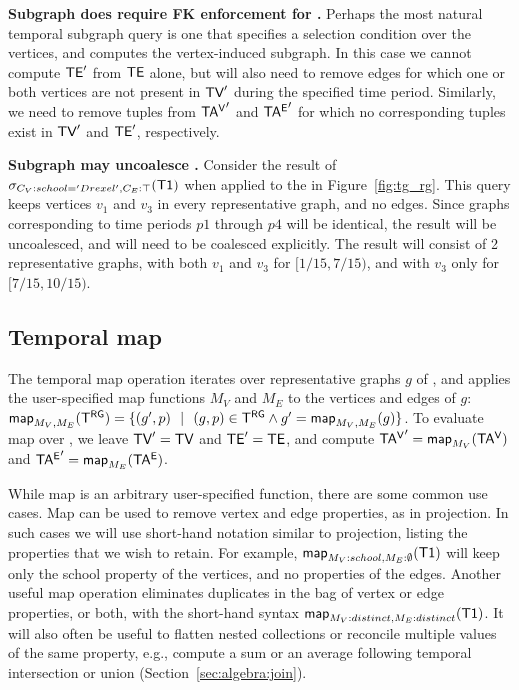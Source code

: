 {\bf Subgraph does require FK enforcement for \tve.}  Perhaps the most
natural temporal subgraph query is one that specifies a selection
condition over the vertices, and computes the vertex-induced subgraph.
In this case we cannot compute $\textsf{TE}'$ from $\textsf{TE}$ alone, but will also
need to remove edges for which one or both vertices are not present in
$\textsf{TV}'$ during the specified time period.  Similarly, we need to remove
tuples from $\mathsf{TA^{V}}'$ and $\mathsf{TA^{E}}'$ for which no corresponding tuples
exist in $\textsf{TV}'$ and $\textsf{TE}'$, respectively.

{\bf Subgraph may uncoalesce \trg.} Consider the result of
$\sigma_{C_V:{school='Drexel'},C_E:\top} (\textsf{T1})$ when applied to
the \tg in Figure~\ref{fig:tg_rg}.  This query keeps vertices $v_1$
and $v_3$ in every representative graph, and no edges.  Since graphs
corresponding to time periods $p1$ through $p4$ will be identical, the
result will be uncoalesced, and will need to be coalesced explicitly.
The result will consist of 2 representative graphs, with both $v_1$
and $v_3$ for $[1/15, 7/15)$, and with $v_3$ only for $[7/15, 10/15)$.

\subsection{Temporal map}
\label{sec:algebra:project}

The temporal map operation iterates over representative graphs $g$ of
\trg, and applies the user-specified map functions $M_V$ and $M_E$ to
the vertices and edges of $g$: $\textsf{map}_{M_V,M_E} (\mathsf{T^{RG}}) = \{(g',
p)~~|~~(g,p) \in \mathsf{T^{RG}} \wedge g'= \textsf{map}_{M_V,M_E}(g)\}$.  To evaluate
map over \tve, we leave $\textsf{TV}'=\textsf{TV}$ and $\textsf{TE}'=\textsf{TE}$, and compute $\mathsf{TA^{V}}' =
\textsf{map}_{M_V}(\mathsf{TA^{V}})$ and $\mathsf{TA^{E}}' = \textsf{map}_{M_E}(\mathsf{TA^{E}})$.

While map is an arbitrary user-specified function, there are some
common use cases.  Map can be used to remove vertex and edge
properties, as in projection.  In such cases we will use short-hand
notation similar to projection, listing the properties that we wish to
retain. For example, $\textsf{map}_{M_V:{school},M_E:\emptyset} (\textsf{T1})$
will keep only the school property of the vertices, and no properties
of the edges.  Another useful map operation eliminates duplicates in
the bag of vertex or edge properties, or both, with the short-hand
syntax $\textsf{map}_{M_V:distinct,M_E:distinct} (\textsf{T1})$.  It will also
often be useful to flatten nested collections or reconcile multiple
values of the same property, e.g., compute a sum or an average
following temporal intersection or union
(Section~\ref{sec:algebra:join}).

